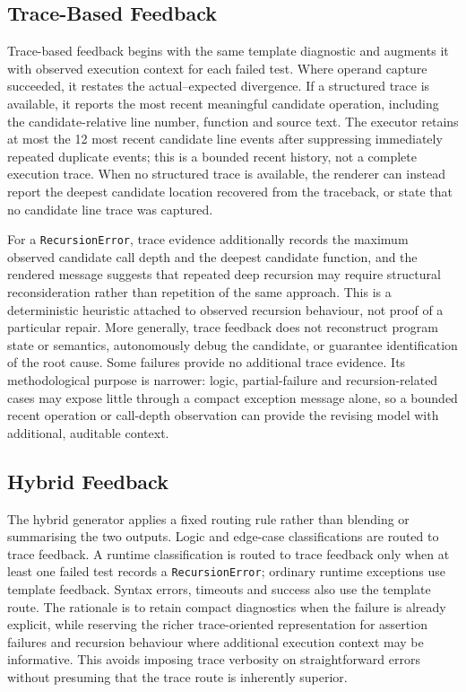 \subsection{Trace-Based Feedback}

Trace-based feedback begins with the same template diagnostic and augments it with observed execution context for each failed test. Where operand capture succeeded, it restates the actual--expected divergence. If a structured trace is available, it reports the most recent meaningful candidate operation, including the candidate-relative line number, function and source text. The executor retains at most the 12 most recent candidate line events after suppressing immediately repeated duplicate events; this is a bounded recent history, not a complete execution trace. When no structured trace is available, the renderer can instead report the deepest candidate location recovered from the traceback, or state that no candidate line trace was captured.

For a \texttt{RecursionError}, trace evidence additionally records the maximum observed candidate call depth and the deepest candidate function, and the rendered message suggests that repeated deep recursion may require structural reconsideration rather than repetition of the same approach. This is a deterministic heuristic attached to observed recursion behaviour, not proof of a particular repair. More generally, trace feedback does not reconstruct program state or semantics, autonomously debug the candidate, or guarantee identification of the root cause. Some failures provide no additional trace evidence. Its methodological purpose is narrower: logic, partial-failure and recursion-related cases may expose little through a compact exception message alone, so a bounded recent operation or call-depth observation can provide the revising model with additional, auditable context.

\subsection{Hybrid Feedback}

The hybrid generator applies a fixed routing rule rather than blending or summarising the two outputs. Logic and edge-case classifications are routed to trace feedback. A runtime classification is routed to trace feedback only when at least one failed test records a \texttt{RecursionError}; ordinary runtime exceptions use template feedback. Syntax errors, timeouts and success also use the template route. The rationale is to retain compact diagnostics when the failure is already explicit, while reserving the richer trace-oriented representation for assertion failures and recursion behaviour where additional execution context may be informative. This avoids imposing trace verbosity on straightforward errors without presuming that the trace route is inherently superior.

